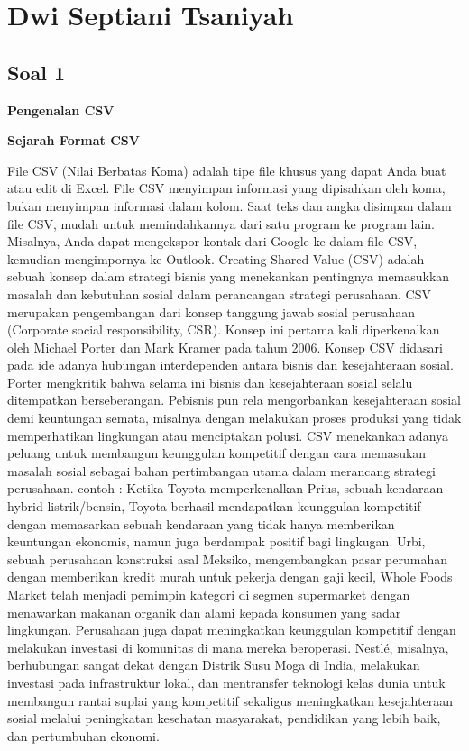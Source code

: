 \section{Dwi Septiani Tsaniyah}
\subsection{Soal 1}
\textbf{Pengenalan CSV}

\textbf{Sejarah Format CSV}

File CSV (Nilai Berbatas Koma) adalah tipe file khusus yang dapat Anda buat atau edit di Excel. File CSV menyimpan informasi yang dipisahkan oleh koma, bukan menyimpan informasi dalam kolom. Saat teks dan angka disimpan dalam file CSV, mudah untuk memindahkannya dari satu program ke program lain. Misalnya, Anda dapat mengekspor kontak dari Google ke dalam file CSV, kemudian mengimpornya ke Outlook.
Creating Shared Value (CSV) adalah sebuah konsep dalam strategi bisnis yang menekankan pentingnya memasukkan masalah dan kebutuhan sosial dalam perancangan strategi perusahaan. CSV merupakan pengembangan dari konsep tanggung jawab sosial perusahaan (Corporate social responsibility, CSR). Konsep ini pertama kali diperkenalkan oleh Michael Porter dan Mark Kramer pada tahun 2006. Konsep CSV didasari pada ide adanya hubungan interdependen antara bisnis dan kesejahteraan sosial. Porter mengkritik bahwa selama ini bisnis dan kesejahteraan sosial selalu ditempatkan berseberangan. Pebisnis pun rela mengorbankan kesejahteraan sosial demi keuntungan semata, misalnya dengan melakukan proses produksi yang tidak memperhatikan lingkungan atau menciptakan polusi. CSV menekankan adanya peluang untuk membangun keunggulan kompetitif dengan cara memasukan masalah sosial sebagai bahan pertimbangan utama dalam merancang strategi perusahaan.
contoh : Ketika Toyota memperkenalkan Prius, sebuah kendaraan hybrid listrik/bensin, Toyota berhasil mendapatkan keunggulan kompetitif dengan memasarkan sebuah kendaraan yang tidak hanya memberikan keuntungan ekonomis, namun juga berdampak positif bagi lingkugan. Urbi, sebuah perusahaan konstruksi asal Meksiko, mengembangkan pasar perumahan dengan memberikan kredit murah untuk pekerja dengan gaji kecil, Whole Foods Market telah menjadi pemimpin kategori di segmen supermarket dengan menawarkan makanan organik dan alami kepada konsumen yang sadar lingkungan. Perusahaan juga dapat meningkatkan keunggulan kompetitif dengan melakukan investasi di komunitas di mana mereka beroperasi. Nestlé, misalnya, berhubungan sangat dekat dengan Distrik Susu Moga di India, melakukan investasi pada infrastruktur lokal, dan mentransfer teknologi kelas dunia untuk membangun rantai suplai yang kompetitif sekaligus meningkatkan kesejahteraan sosial melalui peningkatan kesehatan masyarakat, pendidikan yang lebih baik, dan pertumbuhan ekonomi.

